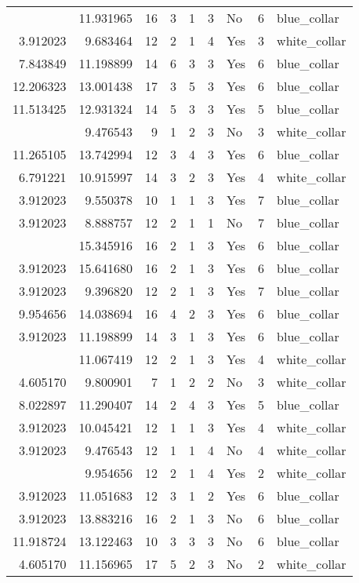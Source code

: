 \documentclass[
]{article}
\begin{document}
\begin{longtable}[t]{rrrrrllrl}
\addlinespace
3.912023 & 11.931965 & 16 & 3 & 1 & 3 & No & 6 & blue\_collar\\
3.912023 & 9.683464 & 12 & 2 & 1 & 4 & Yes & 3 & white\_collar\\
7.843849 & 11.198899 & 14 & 6 & 3 & 3 & Yes & 6 & blue\_collar\\
12.206323 & 13.001438 & 17 & 3 & 5 & 3 & Yes & 6 & blue\_collar\\
11.513425 & 12.931324 & 14 & 5 & 3 & 3 & Yes & 5 & blue\_collar\\
\addlinespace
7.279319 & 9.476543 & 9 & 1 & 2 & 3 & No & 3 & white\_collar\\
11.265105 & 13.742994 & 12 & 3 & 4 & 3 & Yes & 6 & blue\_collar\\
6.791221 & 10.915997 & 14 & 3 & 2 & 3 & Yes & 4 & white\_collar\\
3.912023 & 9.550378 & 10 & 1 & 1 & 3 & Yes & 7 & blue\_collar\\
3.912023 & 8.888757 & 12 & 2 & 1 & 1 & No & 7 & blue\_collar\\
\addlinespace
3.912023 & 15.345916 & 16 & 2 & 1 & 3 & Yes & 6 & blue\_collar\\
3.912023 & 15.641680 & 16 & 2 & 1 & 3 & Yes & 6 & blue\_collar\\
3.912023 & 9.396820 & 12 & 2 & 1 & 3 & Yes & 7 & blue\_collar\\
9.954656 & 14.038694 & 16 & 4 & 2 & 3 & Yes & 6 & blue\_collar\\
3.912023 & 11.198899 & 14 & 3 & 1 & 3 & Yes & 6 & blue\_collar\\
\addlinespace
3.912023 & 11.067419 & 12 & 2 & 1 & 3 & Yes & 4 & white\_collar\\
4.605170 & 9.800901 & 7 & 1 & 2 & 2 & No & 3 & white\_collar\\
8.022897 & 11.290407 & 14 & 2 & 4 & 3 & Yes & 5 & blue\_collar\\
3.912023 & 10.045421 & 12 & 1 & 1 & 3 & Yes & 4 & white\_collar\\
3.912023 & 9.476543 & 12 & 1 & 1 & 4 & No & 4 & white\_collar\\
\addlinespace
3.912023 & 9.954656 & 12 & 2 & 1 & 4 & Yes & 2 & white\_collar\\
3.912023 & 11.051683 & 12 & 3 & 1 & 2 & Yes & 6 & blue\_collar\\
3.912023 & 13.883216 & 16 & 2 & 1 & 3 & No & 6 & blue\_collar\\
11.918724 & 13.122463 & 10 & 3 & 3 & 3 & No & 6 & blue\_collar\\
4.605170 & 11.156965 & 17 & 5 & 2 & 3 & No & 2 & white\_collar\\

\end{longtable}
\end{document}
